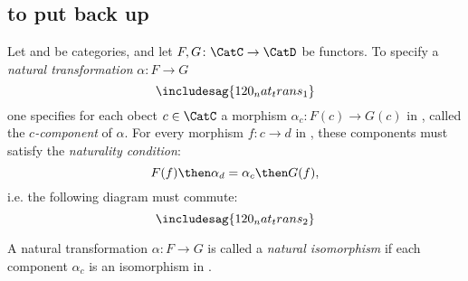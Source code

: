\subsection{to put back up}


\begin{ctdefinition}
Let \CatC and \CatD be categories, and let $F,G\colon \CatC\to \CatD$ be functors. To specify a \emph{natural transformation} $\alpha\colon F\to G$
\begin{equation}
\includesag{120_nat_trans_1}
\end{equation}
one specifies for each obect $c\in \CatC$ a morphism $\alpha_c\colon F(c)\to G(c)$ in \CatD, called the $c$\emph{-component} of $\alpha$. For every morphism $f\colon c\to d$ in \CatC, these components must satisfy the \emph{naturality condition}:
\begin{equation}
    F(f)\then \alpha_d = \alpha_c\then G(f),
\end{equation}
i.e. the following diagram must commute:
\begin{equation}
\includesag{120_nat_trans_2}
\end{equation}
\end{ctdefinition}

\begin{remark}
A natural transformation $\alpha\colon F\to G$ is called a \emph{natural isomorphism} if each component $\alpha_c$ is an isomorphism in \CatD.
\end{remark}

